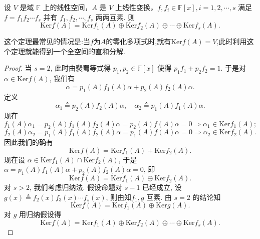 \documentclass[../../main.tex]{subfiles}%
\begin{document}
\begin{theorem}\label{theorem:线性变换互素分解对应核子空间直和分解}
设 $V$ 是域 $\mathbb{F}$ 上的线性空间，$A$ 是 $V$ 上线性变换，$f, f_i \in \mathbb{F}[x], i = 1,2,\cdots, s$ 满足 $f = f_1f_2\cdots f_s$ 并有 $f_1, f_2, \cdots, f_s$ 两两互素. 则
$$\mathrm{Ker} f(A) = \mathrm{Ker} f_1(A) \oplus \mathrm{Ker} f_2(A) \oplus \cdots \oplus \mathrm{Ker} f_s(A).$$
\end{theorem}
\begin{note}
这个定理最常见的情况是:当$f$为$A$的零化多项式时,就有$\mathrm{Ker} f(A)=V$,此时利用这个定理就能得到一个全空间的直和分解.
\end{note}
\begin{proof}

当 $s = 2$, 此时由裴蜀等式得 $p_1, p_2 \in \mathbb{F}[x]$ 使得 $p_1f_1 + p_2f_2 = 1$. 于是对 $\alpha \in \mathrm{Ker} f(A)$, 我们有
$$\alpha = p_1(A)f_1(A)\alpha + p_2(A)f_2(A)\alpha.$$
定义
$$\alpha_1 \triangleq p_2(A)f_2(A)\alpha,\quad \alpha_2 \triangleq p_1(A)f_1(A)\alpha.$$
现在
$$f_1(A)\alpha_1 = p_2(A)f_1(A)f_2(A)\alpha = p_2(A)f(A)\alpha = 0 \Rightarrow \alpha_1 \in \mathrm{Ker} f_1(A);$$
$$f_2(A)\alpha_2 = p_1(A)f_1(A)f_2(A)\alpha = p_1(A)f(A)\alpha = 0 \Rightarrow \alpha_2 \in \mathrm{Ker} f_2(A).$$
因此我们的确有
$$\mathrm{Ker} f(A) = \mathrm{Ker} f_1(A) + \mathrm{Ker} f_2(A).$$
现在设 $\alpha \in \mathrm{Ker} f_1(A) \cap \mathrm{Ker} f_2(A)$, 于是 $\alpha = p_1(A)f_1(A)\alpha + p_2(A)f_2(A)\alpha = 0$, 即
$$\mathrm{Ker} f(A) = \mathrm{Ker} f_1(A) \oplus \mathrm{Ker} f_2(A).$$
对 $s > 2$, 我们考虑归纳法. 假设命题对 $s - 1$ 已经成立, 设 $g(x) \triangleq f_2(x)f_3(x)\cdots f_s(x)$, 则由知$f_1, g$ 互素. 由 $s = 2$ 的结论知
$$\mathrm{Ker} f(A) = \mathrm{Ker} f_1(A) \oplus \mathrm{Ker} g(A).$$
对 $g$ 用归纳假设得
$$\mathrm{Ker} f(A) = \mathrm{Ker} f_1(A) \oplus \mathrm{Ker} f_2(A) \oplus \cdots \oplus \mathrm{Ker} f_s(A).$$

\end{proof}
\end{document}
